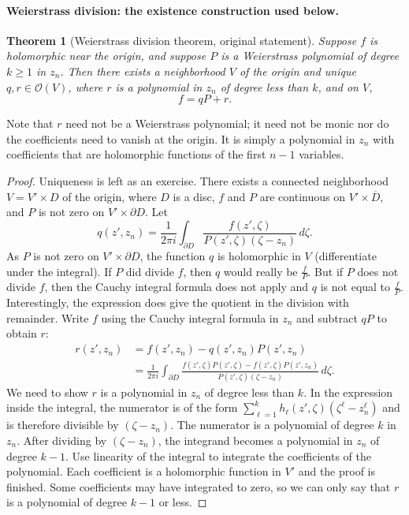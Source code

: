 \documentclass[UTF8,11pt]{ctexart}
\newtheorem*{thm}{Theorem}
\theoremstyle{definition}
\newcommand{\sO}{\mathscr O}
\newcommand{\widebar}[1]{\overline{#1}}
\begin{document}
\paragraph{Weierstrass division: the existence construction used below.}
\begin{thm}[Weierstrass division theorem, original statement]
Suppose $f$ is holomorphic near the origin, and suppose $P$ is a Weierstrass polynomial of degree $k\geq1$ in $z_n$. Then there exists a neighborhood $V$ of the origin and unique $q,r\in\sO(V)$, where $r$ is a polynomial in $z_n$ of degree less than $k$, and on $V$,
\[f=qP+r.\]
\end{thm}
Note that $r$ need not be a Weierstrass polynomial; it need not be monic nor do the coefficients need to vanish at the origin. It is simply a polynomial in $z_n$ with coefficients that are holomorphic functions of the first $n-1$ variables.
\begin{proof}
Uniqueness is left as an exercise. There exists a connected neighborhood $V=V'\times D$ of the origin, where $D$ is a disc, $f$ and $P$ are continuous on $V'\times\widebar D$, and $P$ is not zero on $V'\times\partial D$. Let
\[
q(z',z_n)=\frac1{2\pi i}\int_{\partial D}\frac{f(z',\zeta)}{P(z',\zeta)(\zeta-z_n)}\,d\zeta.
\]
As $P$ is not zero on $V'\times\partial D$, the function $q$ is holomorphic in $V$ (differentiate under the integral). If $P$ did divide $f$, then $q$ would really be $\frac fP$. But if $P$ does not divide $f$, then the Cauchy integral formula does not apply and $q$ is not equal to $\frac fP$. Interestingly, the expression does give the quotient in the division with remainder. Write $f$ using the Cauchy integral formula in $z_n$ and subtract $qP$ to obtain $r$:
\begin{align*}
r(z',z_n)&=f(z',z_n)-q(z',z_n)P(z',z_n)\\
&=\frac1{2\pi i}\int_{\partial D}\frac{f(z',\zeta)P(z',\zeta)-f(z',\zeta)P(z',z_n)}{P(z',\zeta)(\zeta-z_n)}\,d\zeta.
\end{align*}
We need to show $r$ is a polynomial in $z_n$ of degree less than $k$. In the expression inside the integral, the numerator is of the form $\sum_{\ell=1}^k h_\ell(z',\zeta)(\zeta^\ell-z_n^\ell)$ and is therefore divisible by $(\zeta-z_n)$. The numerator is a polynomial of degree $k$ in $z_n$. After dividing by $(\zeta-z_n)$, the integrand becomes a polynomial in $z_n$ of degree $k-1$. Use linearity of the integral to integrate the coefficients of the polynomial. Each coefficient is a holomorphic function in $V'$ and the proof is finished. Some coefficients may have integrated to zero, so we can only say that $r$ is a polynomial of degree $k-1$ or less.
\end{proof}
\end{document}
